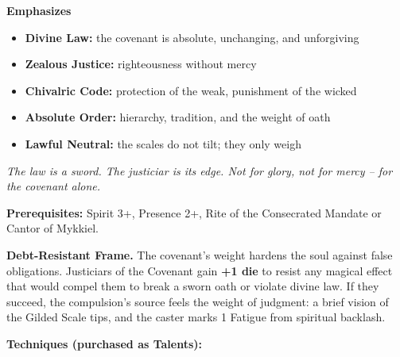 \noindent\textbf{Emphasizes}
\begin{itemize}
  \item \textbf{Divine Law:} the covenant is absolute, unchanging, and unforgiving
  \item \textbf{Zealous Justice:} righteousness without mercy
  \item \textbf{Chivalric Code:} protection of the weak, punishment of the wicked
  \item \textbf{Absolute Order:} hierarchy, tradition, and the weight of oath
  \item \textbf{Lawful Neutral:} the scales do not tilt; they only weigh
\end{itemize}

\begin{tcolorbox}[colback=black!5,colframe=gold!70!black,title=\textbf{Covenant Justiciar (Mykkiel)},breakable]
  \emph{The law is a sword. The justiciar is its edge. Not for glory, not for mercy -- for the covenant alone.}

  \vspace{2mm}
  \noindent\textbf{Prerequisites:} Spirit 3+, Presence 2+, Rite of the Consecrated Mandate or Cantor of Mykkiel.

  \vspace{2mm}
  \noindent\textbf{Debt-Resistant Frame.} The covenant's weight hardens the soul against false obligations. Justiciars of the Covenant gain \textbf{+1 die} to resist any magical effect that would compel them to break a sworn oath or violate divine law. If they succeed, the compulsion's source feels the weight of judgment: a brief vision of the Gilded Scale tips, and the caster marks 1 Fatigue from spiritual backlash.

  \vspace{2mm}
  \noindent\textbf{Techniques (purchased as Talents):}


\end{tcolorbox}
